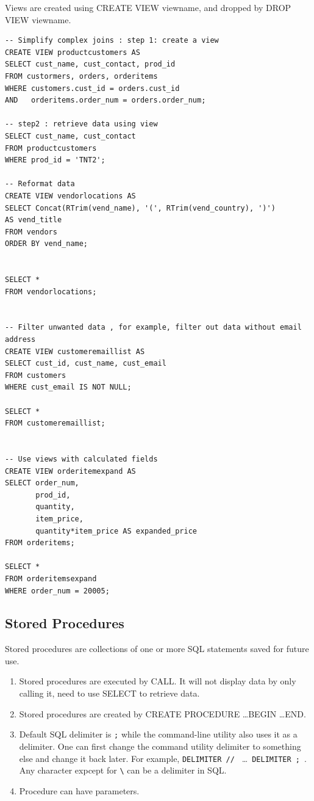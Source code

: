 \documentclass[12pt,oneside,a4paper]{article}
\begin{document}
Views are created using \textsf{CREATE VIEW viewname}, and dropped by \textsf{DROP VIEW viewname}.

\begin{lstlisting}
-- Simplify complex joins : step 1: create a view 
CREATE VIEW productcustomers AS 
SELECT cust_name, cust_contact, prod_id
FROM custormers, orders, orderitems
WHERE customers.cust_id = orders.cust_id
AND   orderitems.order_num = orders.order_num;

-- step2 : retrieve data using view 
SELECT cust_name, cust_contact
FROM productcustomers
WHERE prod_id = 'TNT2';

-- Reformat data 
CREATE VIEW vendorlocations AS
SELECT Concat(RTrim(vend_name), '(', RTrim(vend_country), ')')
AS vend_title
FROM vendors
ORDER BY vend_name;


SELECT * 
FROM vendorlocations;


-- Filter unwanted data , for example, filter out data without email address
CREATE VIEW customeremaillist AS 
SELECT cust_id, cust_name, cust_email
FROM customers
WHERE cust_email IS NOT NULL;

SELECT * 
FROM customeremaillist;


-- Use views with calculated fields 
CREATE VIEW orderitemexpand AS 
SELECT order_num, 
       prod_id, 
       quantity, 
       item_price,
       quantity*item_price AS expanded_price
FROM orderitems;

SELECT * 
FROM orderitemsexpand
WHERE order_num = 20005; 
\end{lstlisting}


\subsection{Stored Procedures}
Stored procedures are collections of one or more SQL statements saved for future use. 

\begin{enumerate}
\item Stored procedures are executed by \textsf{CALL}. It will not display data by only calling it, need to use \textsf{SELECT} to retrieve data. 

\item Stored procedures are created by \textsf{CREATE PROCEDURE \ldots BEGIN \ldots END}.


\item Default SQL delimiter is \verb|;| while the command-line utility also uses it as a delimiter. One can first change the command utility delimiter to something else and change it back later. For example, \verb|DELIMITER // | \ldots \verb| DELIMITER ; |. Any character expcept for \verb|\| can be a delimiter in SQL.

\item Procedure can have parameters. 
\end{enumerate}
\end{document}
